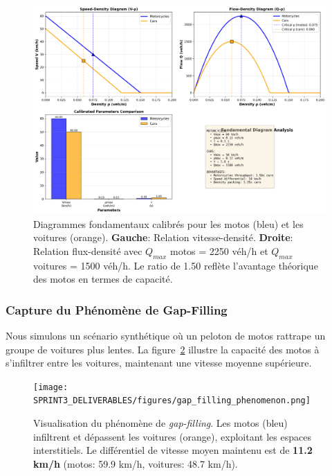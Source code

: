 \begin{figure}[htbp]
    \centering
    \includegraphics[width=\textwidth]{SPRINT3_DELIVERABLES/figures/fundamental_diagrams.png}
    \caption{Diagrammes fondamentaux calibrés pour les motos (bleu) et les voitures (orange). \textbf{Gauche}: Relation vitesse-densité. \textbf{Droite}: Relation flux-densité avec $Q_{max}$ motos = 2250 véh/h et $Q_{max}$ voitures = 1500 véh/h. Le ratio de 1.50 reflète l'avantage théorique des motos en termes de capacité.}
    \label{fig:fundamental_diagrams}
\end{figure}

\subsubsection{Capture du Phénomène de Gap-Filling}
\label{subsec:validation_gap_filling}

Nous simulons un scénario synthétique où un peloton de motos rattrape un groupe de voitures plus lentes. La figure~\ref{fig:gap_filling_uxsim} illustre la capacité des motos à s'infiltrer entre les voitures, maintenant une vitesse moyenne supérieure.

\begin{figure}[htbp]
    \centering
    \texttt{[image: SPRINT3\_DELIVERABLES/figures/gap\_filling\_phenomenon.png]}
    \caption{Visualisation du phénomène de \textit{gap-filling}. Les motos (bleu) infiltrent et dépassent les voitures (orange), exploitant les espaces interstitiels. Le différentiel de vitesse moyen maintenu est de \textbf{11.2 km/h} (motos: 59.9 km/h, voitures: 48.7 km/h).}
    \label{fig:gap_filling_uxsim}
\end{figure}

